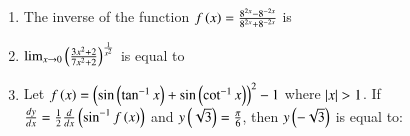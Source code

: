 \documentclass[journal,12pt,onecolumn]{IEEEtran}
\theoremstyle{remark}
\begin{document}
\begin{enumerate}
\hfill{}
\begin{enumerate}
\end{enumerate}

\item The inverse of the function $f\left(x\right)=\frac{8^{2x}-8^{-2x}}{8^{2x}+8^{-2x}}$ is

\hfill{}
\begin{enumerate}
\end{enumerate}

\item $\lim_{x\to 0}\left(\frac{3x^2+2}{7x^2+2}\right)^{\frac{1}{x^2}}$ is equal to

\hfill{}
\begin{enumerate}
\end{enumerate}

\item Let $f\left(x\right)=\left(\sin\left({\tan^{-1}x}\right)+\sin\left({\cot^{-1}x}\right)\right)^2-1$ where $\left\vert x\right\vert>1$. If\newline
$\frac{dy}{dx}=\frac{1}{2}\frac{d}{dx}\left(\sin^{-1}f\left(x\right)\right)$\newline
and $y\left(\sqrt{3}\right)=\frac{\pi}{6}$, then $y\left(-\sqrt{3}\right)$ is equal to:

\hfill{}
\begin{enumerate}
\end{enumerate}


\end{enumerate}
\end{document}
